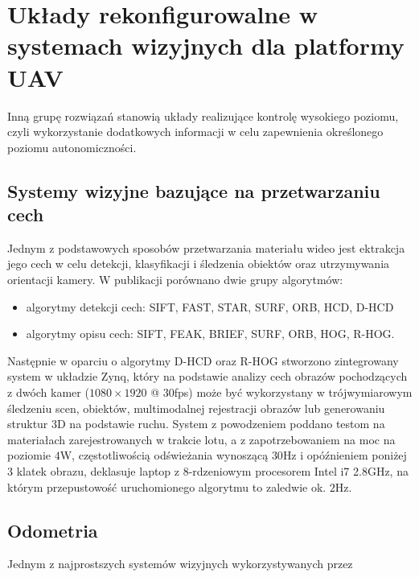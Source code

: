 \section{Układy rekonfigurowalne w systemach wizyjnych dla platformy UAV}

Inną grupę rozwiązań stanowią układy realizujące kontrolę wysokiego poziomu, czyli wykorzystanie dodatkowych informacji w celu zapewnienia określonego poziomu autonomiczności.
 
\subsection{Systemy wizyjne bazujące na przetwarzaniu cech}
Jednym z podstawowych sposobów przetwarzania materiału wideo jest ektrakcja jego cech w celu detekcji, klasyfikacji i śledzenia obiektów oraz utrzymywania orientacji kamery. W publikacji \cite{RHOG} porównano dwie grupy algorytmów:
\begin{itemize}
	\item algorytmy detekcji cech: SIFT, FAST, STAR, SURF, ORB, HCD, D-HCD
	\item algorytmy opisu cech: SIFT, FEAK, BRIEF, SURF, ORB, HOG, R-HOG.
\end{itemize} 
Następnie w oparciu o algorytmy D-HCD oraz R-HOG stworzono zintegrowany system w układzie Zynq, który na podstawie analizy cech obrazów pochodzących z dwóch kamer ($1080\times 1920$ @ $30$fps) może być wykorzystany w trójwymiarowym śledzeniu scen, obiektów, multimodalnej rejestracji obrazów lub generowaniu struktur 3D na podstawie ruchu. System z powodzeniem poddano testom na materiałach zarejestrowanych w trakcie lotu, a z zapotrzebowaniem na moc na poziomie $4$W, częstotliwością odświeżania wynoszącą $30$Hz i opóźnieniem poniżej $3$ klatek obrazu, deklasuje laptop z 8-rdzeniowym procesorem Intel i7 2.8GHz, na którym przepustowość uruchomionego algorytmu to zaledwie ok. $2$Hz.

\subsection{Odometria}
Jednym z najprostszych systemów wizyjnych wykorzystywanych przez

